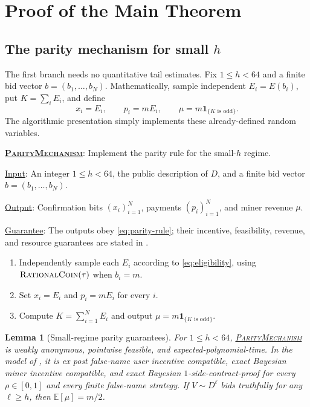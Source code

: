 \documentclass[11pt]{article}
\newenvironment{fminipage}%
  {\begin{Sbox}\begin{minipage}}%
  {\end{minipage}\end{Sbox}\fbox{\TheSbox}}
\newenvironment{algbox}[0]{%
\vskip 0.2in
\noindent
\begin{fminipage}{6.3in}
}{%
\end{fminipage}
\vskip 0.2in
}
\newtheorem{lemma}{Lemma}[section]
\begin{document}
\section{Proof of the Main Theorem}
\label{sec:proof-main}

\subsection{The parity mechanism for small \texorpdfstring{$h$}{h}}

The first branch needs no quantitative tail estimates.  Fix $1\le h<64$ and
a finite bid vector $b=(b_1,\ldots,b_N)$.  Mathematically, sample independent
$E_i=E(b_i)$, put $K=\sum_i E_i$, and define
\begin{equation}
x_i=E_i,
\qquad
p_i=mE_i,
\qquad
\mu=m\mathbf{1}_{\{K\text{ is odd}\}}.
\label{eq:parity-rule}
\end{equation}
The algorithmic presentation simply implements these already-defined random
variables.

\begin{algbox}
\label{alg:parity-mechanism}
\textbf{\uline{\textsc{ParityMechanism}}}: Implement the parity rule for the
small-$h$ regime.

\uline{Input}: An integer $1\le h<64$, the public description of $D$, and a
finite bid vector $b=(b_1,\ldots,b_N)$.

\uline{Output}: Confirmation bits $(x_i)_{i=1}^N$, payments $(p_i)_{i=1}^N$,
and miner revenue $\mu$.

\uline{Guarantee}: The outputs obey \eqref{eq:parity-rule}; their incentive,
feasibility, revenue, and resource guarantees are stated in
.
\begin{enumerate}
  \item Independently sample each $E_i$ according to
  \eqref{eq:eligibility}, using
  $\text{\textsc{RationalCoin}}(\tau)$ when $b_i=m$.
  \item Set $x_i=E_i$ and $p_i=mE_i$ for every $i$.
  \item Compute $K=\sum_{i=1}^N E_i$ and output
  $\mu=m\mathbf{1}_{\{K\text{ is odd}\}}$.
\end{enumerate}
\end{algbox}

\begin{lemma}[Small-regime parity guarantees]
\label{lem:parity-guarantees}
For $1\le h<64$, \hyperref[alg:parity-mechanism]{\textsc{ParityMechanism}}
is weakly anonymous, pointwise feasible, and expected-polynomial-time.  In the
model of , it is ex post false-name user incentive compatible,
exact Bayesian miner incentive compatible, and exact Bayesian
$1$-side-contract-proof for every $\rho\in[0,1]$ and every finite false-name
strategy.  If $V\sim D^\ell$ bids truthfully for any $\ell\ge h$, then
$\mathbb{E}[\mu]=m/2$.
\end{lemma}
\end{document}
